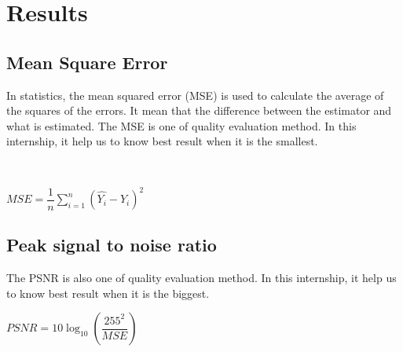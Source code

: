 \chapter{Results}
\section*{Mean Square Error}
In statistics, the mean squared error (MSE) is used to calculate the average of the squares of the errors. It
mean that the difference between the estimator and what is estimated.
The MSE is one of quality evaluation method. In this internship, it help us to know best result when it is the smallest.
 





\

\begin{center}

	$MSE =  \dfrac{1}{n} \displaystyle \sum_{i=1}^{n}(\hat{Y_i} - Y_i)^2$
	

\end{center}
\vspace{3cm}

\section*{Peak signal to noise ratio}
The PSNR is also one of quality evaluation method. In this internship, it help us to know best result when it is the biggest. 

\vspace{1cm}

\begin{center}
	
	$PSNR = 10\log_{10}\left(\dfrac{255^2}{MSE}\right)  $
	
	
\end{center}
\newpage


